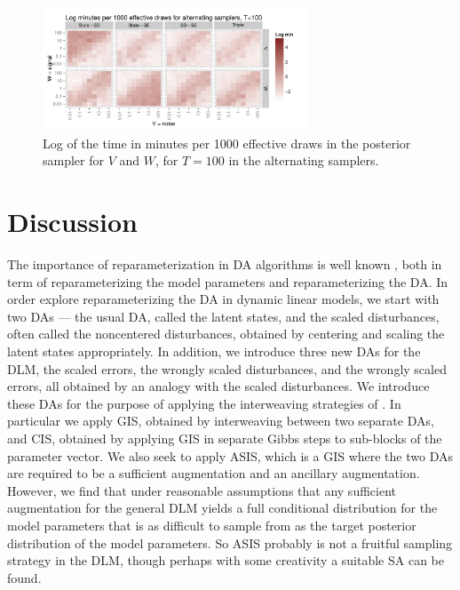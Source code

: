 \documentclass{article}
\begin{document}
\begin{figure}[!ht]
\centering
\includegraphics[width=0.7\textwidth]{altinttimeplot100}
\caption{Log of the time in minutes per 1000 effective draws in the posterior sampler for $V$ and $W$, for $T=100$ in the alternating samplers.}
\label{altinttimeplot}
\end{figure}

\section{Discussion}\label{sec:Discuss}

The importance of reparameterization in DA algorithms is well known \cite{papaspiliopoulos2007general}, both in term of reparameterizing the model parameters and reparameterizing the DA. In order explore reparameterizing the DA in dynamic linear models, we start with two DAs --- the usual DA, called the latent states, and the scaled disturbances, often called the noncentered disturbances, obtained by centering and scaling the latent states appropriately. In addition, we introduce three new DAs for the DLM, the scaled errors, the wrongly scaled disturbances, and the wrongly scaled errors, all obtained by an analogy with the scaled disturbances. We introduce these DAs for the purpose of applying the interweaving strategies of . In particular we apply GIS, obtained by interweaving between two separate DAs, and CIS, obtained by applying GIS in separate Gibbs steps to sub-blocks of the parameter vector. We also seek to apply ASIS, which is a GIS where the two DAs are required to be a sufficient augmentation and an ancillary augmentation. However, we find that under reasonable assumptions that any sufficient augmentation for the general DLM yields a full conditional distribution for the model parameters that is as difficult to sample from as the target posterior distribution of the model parameters. So ASIS probably is not a fruitful sampling strategy in the DLM, though perhaps with some creativity a suitable SA can be found.
\end{document}
